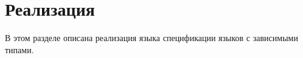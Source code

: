 \section{Реализация}
В этом разделе описана реализация языка спецификации языков с зависимыми типами.












